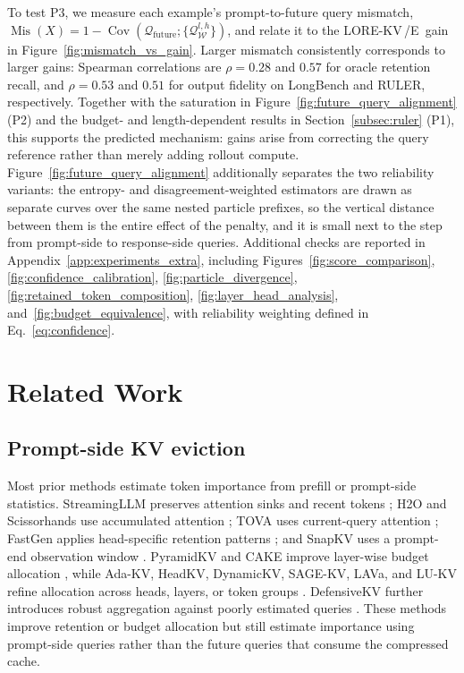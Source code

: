 \documentclass{article} %
\newcommand{\lorekvE}{LORE-KV\,/E}
\begin{document}
To test P3, we measure each example's prompt-to-future query mismatch,
$\operatorname{Mis}(X)=1-\operatorname{Cov}(\mathcal{Q}_{\mathrm{future}};\{\mathcal{Q}^{l,h}_{\mathcal{W}}\})$,
and relate it to the \lorekvE\ gain in Figure~\ref{fig:mismatch_vs_gain}. Larger mismatch consistently corresponds to larger gains: Spearman correlations are $\rho=0.28$ and $0.57$ for oracle retention recall, and $\rho=0.53$ and $0.51$ for output fidelity on LongBench and RULER, respectively. Together with the saturation in Figure~\ref{fig:future_query_alignment} (P2) and the budget- and length-dependent results in Section~\ref{subsec:ruler} (P1), this supports the predicted mechanism: gains arise from correcting the query reference rather than merely adding rollout compute. Figure~\ref{fig:future_query_alignment} additionally separates the two reliability variants: the entropy- and disagreement-weighted estimators are drawn as separate curves over the same nested particle prefixes, so the vertical distance between them is the entire effect of the penalty, and it is small next to the step from prompt-side to response-side queries. Additional checks are reported in Appendix~\ref{app:experiments_extra}, including Figures~\ref{fig:score_comparison}, \ref{fig:confidence_calibration}, \ref{fig:particle_divergence}, \ref{fig:retained_token_composition}, \ref{fig:layer_head_analysis}, and~\ref{fig:budget_equivalence}, with reliability weighting defined in Eq.~\eqref{eq:confidence}.

\section{Related Work}
\label{sec:related_work}
\subsection{Prompt-side KV eviction} \label{subsec:rw_eviction}
Most prior methods estimate token importance from prefill or prompt-side statistics. StreamingLLM preserves attention sinks and recent tokens \citep{xiao2023streamingllm}; H2O and Scissorhands use accumulated attention \citep{zhang2023h2o,liu2023scissorhands}; TOVA uses current-query attention \citep{oren2024transformers}; FastGen applies head-specific retention patterns \citep{ge2024fastgen}; and SnapKV uses a prompt-end observation window \citep{li2024snapkv}. PyramidKV and CAKE improve layer-wise budget allocation \citep{cai2024pyramidkv,qin2025cake}, while Ada-KV, HeadKV, DynamicKV, SAGE-KV, LAVa, and LU-KV refine allocation across heads, layers, or token groups \citep{feng2024adakv,fu2024headkv,zhou2024dynamickv,wang2025sagekv,shen2025lava,tang2026lukv}. DefensiveKV further introduces robust aggregation against poorly estimated queries \citep{feng2025taming}. These methods improve retention or budget allocation but still estimate importance using prompt-side queries rather than the future queries that consume the compressed cache.
\end{document}
